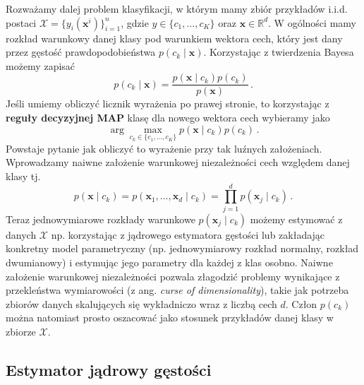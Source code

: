 \documentclass{myclass}
\numberwithin{equation}{subsection}
\begin{document}
Rozważamy dalej problem klasyfikacji, w którym mamy zbiór przykładów i.i.d. postaci \(\mathcal{X} =
\{y_i(\mathbf{x}^i)\}_{i=1}^n\), gdzie \(y \in \{c_1, \ldots, c_K\} \) oraz \(\mathbf{x} \in
\mathbb{R}^d\). W ogólności mamy rozkład warunkowy danej klasy pod warunkiem wektora cech, który
jest dany przez gęstość prawdopodobieństwa \(p(c_k \mid \mathbf{x})\). Korzystając z twierdzenia
Bayesa możemy zapisać
\begin{equation}
    p(c_k \mid \mathbf{x}) = \frac{p(\mathbf{x} \mid c_k) p(c_k)}{p(\mathbf{x})}\,.
\end{equation}
Jeśli umiemy obliczyć licznik wyrażenia po prawej stronie, to korzystając z \textbf{reguły
decyzyjnej MAP} klasę dla nowego wektora cech wybieramy jako
\begin{equation}
    \arg\max_{c_k \in \{c_1, \ldots, c_K\}} p(\mathbf{x} \mid c_k) p(c_k)\,.
\end{equation}
Powstaje pytanie jak obliczyć to wyrażenie przy tak luźnych założeniach. Wprowadzamy naiwne
założenie warunkowej niezależności cech względem danej klasy tj.
\begin{equation}
    p(\mathbf{x} \mid c_k) = p(\mathbf{x}_1, \ldots, \mathbf{x}_d \mid c_k) = \prod_{j=1}^d p(\mathbf{x}_j \mid c_k)\,.
\end{equation}
Teraz jednowymiarowe rozkłady warunkowe \(p(\mathbf{x}_j \mid c_k)\) możemy estymować z danych
\(\mathcal{X}\) np. korzystając z jądrowego estymatora gęstości lub zakładając konkretny model
parametryczny (np. jednowymiarowy rozkład normalny, rozkład dwumianowy) i estymując jego parametry
dla każdej z klas osobno. Naiwne założenie warunkowej niezależności pozwala złagodzić problemy
wynikające z przekleństwa wymiarowości (z ang. \textit{curse of dimensionality}), takie jak potrzeba
zbiorów danych skalujących się wykładniczo wraz z liczbą cech \(d\). Człon \(p(c_k)\) można
natomiast prosto oszacować jako stosunek przykładów danej klasy w zbiorze \(\mathcal{X}\).


\subsection{Estymator jądrowy gęstości}
\end{document}
